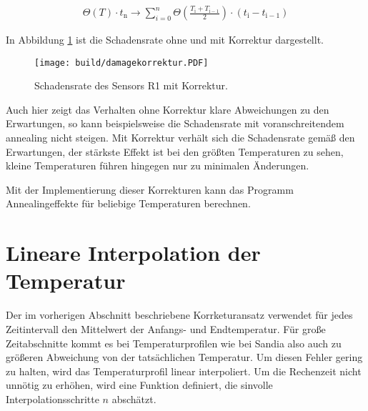 \begin{align}
  \Theta(T) \cdot t_{\mathrm{n}} \rightarrow \sum_{i=0}^n   \Theta \left(\frac{T_{\mathrm{i}} +T_{\mathrm{i-1}}}{2}\right) \cdot  (t_{\mathrm{i}} - t_{\mathrm{i-1}})
\end{align}

In Abbildung \ref{fig:korrektur_damage} ist die Schadensrate ohne und mit Korrektur
dargestellt.

\begin{figure}
    \texttt{[image: build/damagekorrektur.PDF]}
\caption{Schadensrate des Sensors R1  mit Korrektur.}
\label{fig:korrektur_damage}
\end{figure}


Auch hier zeigt das Verhalten ohne Korrektur klare Abweichungen zu den
Erwartungen, so kann beispielsweise die Schadensrate mit voranschreitendem annealing nicht steigen.
Mit Korrektur verhält sich die Schadensrate gemäß den Erwartungen, der stärkste
Effekt ist bei den größten Temperaturen zu sehen, kleine Temperaturen führen hingegen
nur zu minimalen Änderungen.

Mit der Implementierung dieser Korrekturen kann das Programm Annealingeffekte für
beliebige Temperaturen berechnen.



\section{Lineare Interpolation der Temperatur}
Der im vorherigen Abschnitt beschriebene Korrketuransatz verwendet für jedes
Zeitintervall den Mittelwert der Anfangs- und Endtemperatur. Für große
Zeitabschnitte kommt es bei Temperaturprofilen wie bei Sandia also auch zu größeren Abweichung von der tatsächlichen
Temperatur. Um diesen Fehler gering zu halten, wird das Temperaturprofil
linear interpoliert.
Um die Rechenzeit nicht unnötig zu erhöhen, wird eine Funktion definiert, die sinvolle
Interpolationsschritte $n$ abschätzt.

